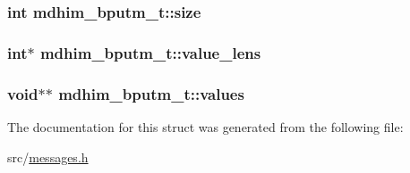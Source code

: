\hypertarget{structmdhim__bputm__t_a480571293980863083cce4de0287a9c3}{
\subsubsection[{size}]{\setlength{\rightskip}{0pt plus 5cm}int mdhim\-\_\-bputm\-\_\-t\-::size}}\label{d1/ddf/structmdhim__bputm__t_a480571293980863083cce4de0287a9c3}
\hypertarget{structmdhim__bputm__t_a915478fbead386af153b4b3989ff7fb6}{
\subsubsection[{value\-\_\-lens}]{\setlength{\rightskip}{0pt plus 5cm}int$\ast$ mdhim\-\_\-bputm\-\_\-t\-::value\-\_\-lens}}\label{d1/ddf/structmdhim__bputm__t_a915478fbead386af153b4b3989ff7fb6}
\hypertarget{structmdhim__bputm__t_a1b908d082b136370db7574dc25d44853}{
\subsubsection[{values}]{\setlength{\rightskip}{0pt plus 5cm}void$\ast$$\ast$ mdhim\-\_\-bputm\-\_\-t\-::values}}\label{d1/ddf/structmdhim__bputm__t_a1b908d082b136370db7574dc25d44853}


The documentation for this struct was generated from the following file\-:\begin{DoxyCompactItemize}
\item 
src/\hyperlink{messages_8h}{messages.\-h}\end{DoxyCompactItemize}
